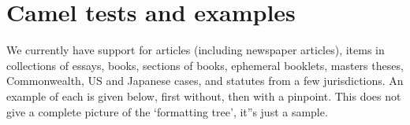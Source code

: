 \documentclass{article}
\begin{document}

\section*{{\sc Camel} tests and examples\footnotemark{}{} }

We currently have support for articles (including newspaper
articles), items in collections of
essays, books, sections of books, ephemeral booklets, masters theses,
Commonwealth, US and Japanese cases, and statutes from a few
jurisdictions.  An example of each is given below, first without,
then with a pinpoint.  This does not give a complete picture of
the `formatting tree', it''s just a sample.
\end{document}
